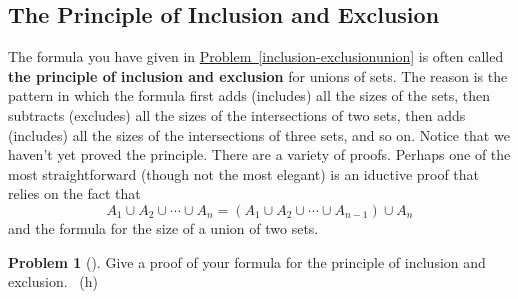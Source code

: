 \documentclass[10pt,]{book}
\newcommand{\terminology}[1]{\textbf{#1}}
\theoremstyle{plain}
\theoremstyle{definition}
\newtheorem{activity}[project]{Problem}
\theoremstyle{definition}
\numberwithin{equation}{chapter}
\begin{document}
\subsection[{The Principle of Inclusion and Exclusion}]{The Principle of Inclusion and Exclusion}\label{subsection-53}
\hypertarget{p-1349}{}%
The formula you have given in \hyperref[inclusion-exclusionunion]{Problem~\ref{inclusion-exclusionunion}} is often called \terminology{the principle of inclusion and exclusion} for unions of sets. The reason is the pattern in which the formula first adds (includes) all the sizes of the sets, then subtracts (excludes) all the sizes of the intersections of two sets, then adds (includes) all the sizes of the intersections of three sets, and so on.   Notice that we haven't yet proved the principle. There are a variety of proofs.  Perhaps one of the most straightforward (though not the most elegant) is an iductive proof that relies on the fact that%
\begin{equation*}
A_1 \cup A_2 \cup \cdots \cup A_n = \left(A_1 \cup A_2 \cup \cdots \cup A_{n-1}\right) \cup A_n
\end{equation*}
and the formula for the size of a union of two sets.%
\begin{activity}[]\marginsymbol[-1em]{} \label{activity-232}
\hypertarget{p-1350}{}%
Give a proof of your formula for the principle of inclusion and exclusion.%
~{\tiny (h)}\end{activity}
\end{document}
